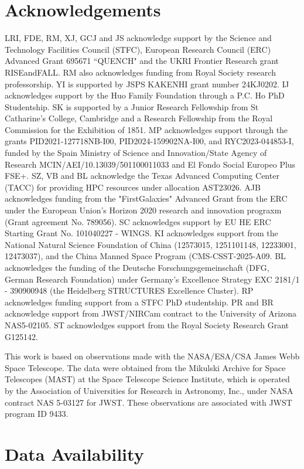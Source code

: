 \documentclass[fleqn,usenatbib]{mnras}
\begin{document}
\section*{Acknowledgements}
LRI, FDE, RM, XJ, GCJ and JS acknowledge support by the Science and Technology Facilities Council (STFC), European Research Council (ERC) Advanced Grant 695671 “QUENCH" and the UKRI Frontier Research grant RISEandFALL. RM also acknowledges funding from Royal Society research professorship. 
YI is supported by JSPS KAKENHI grant number 24KJ0202. 
Ĳ acknowledges support by the Huo Family Foundation through a P.C. Ho PhD Studentship. 
SK is supported by a Junior Research Fellowship from St Catharine’s College, Cambridge and a Research Fellowship from the Royal Commission for the Exhibition of 1851. 
MP acknowledges support through the grants PID2021-127718NB-I00, PID2024-159902NA-I00, and RYC2023-044853-I, funded by the Spain Ministry of Science and Innovation/State Agency of Research MCIN/AEI/10.13039/501100011033 and El Fondo Social Europeo Plus FSE+.
SZ, VB and BL acknowledge the Texas Advanced Computing Center (TACC) for providing HPC resources under allocation AST23026. 
AJB acknowledges funding from the "FirstGalaxies" Advanced Grant from the ERC under the European Union's Horizon 2020 research and innovation prograxm (Grant agreement No. 789056).
SC acknowledges support by EU HE ERC Starting Grant No. 101040227 - WINGS.
KI acknowledges support from the National Natural Science Foundation of China (12573015, 1251101148, 12233001, 12473037), and the China Manned Space Program (CMS-CSST-2025-A09.
BL acknowledges the funding of the Deutsche Forschungsgemeinschaft (DFG, German Research Foundation) under Germany's Excellence Strategy EXC 2181/1 - 390900948 (the Heidelberg STRUCTURES Excellence Cluster).
RP acknowledges funding support from a STFC PhD studentship.
PR and BR acknowledge support from JWST/NIRCam contract to the University of Arizona NAS5-02105.
ST acknowledges support from the Royal Society Research Grant G125142.

This work is based on observations made with the NASA/ESA/CSA James Webb Space Telescope. The data were obtained from the Mikulski Archive for Space Telescopes (MAST) at the Space Telescope Science Institute, which is operated by the Association of Universities for Research in Astronomy, Inc., under NASA contract NAS 5-03127 for JWST. These observations are associated with JWST program ID 9433.

\section*{Data Availability}
\end{document}
